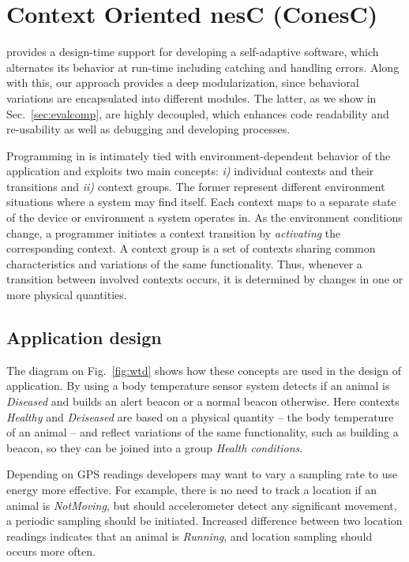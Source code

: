 
\section{Context Oriented nesC (ConesC)}\label{sec:conesc}

\conesc provides a design-time support for developing a self-adaptive software,
which alternates its behavior at run-time including catching and handling
errors. Along with this, our approach provides a deep modularization, since
behavioral variations are encapsulated into different modules. The latter, as we
show in Sec.~\ref{sec:evalcomp}, are highly decoupled, which enhances code
readability and re-usability as well as debugging and developing processes.

Programming in \conesc is intimately tied with environment-dependent behavior of
the application and exploits two main concepts: \emph{i)} individual contexts
and their transitions and \emph{ii)} context groups. The former represent
different environment situations where a system may find itself. Each context
maps to a separate state of the device or environment a system operates in. As
the environment conditions change, a programmer initiates a context transition
by \emph{activating} the corresponding context. A context group is a set of
contexts sharing common characteristics and variations of the same
functionality. Thus, whenever a transition between involved contexts occurs, it
is determined by changes in one or more physical quantities.

\subsection{Application design}\label{sec:appdesign}

The diagram on Fig.~\ref{fig:wtd} shows how these concepts are used in the
design of application. By using a body temperature sensor system detects if an
animal is \emph{Diseased} and builds an alert beacon or a normal beacon
otherwise. Here contexts \emph{Healthy} and \emph{Deiseased} are based on a
physical quantity -- the body temperature of an animal -- and reflect variations
of the same functionality, such as building a beacon, so they can be joined into
a group \emph{Health conditions}.

Depending on GPS readings developers may want to vary a sampling rate to use
energy more effective. For example, there is no need to track a location if an
animal is \emph{NotMoving}, but should accelerometer detect any significant
movement, a periodic sampling should be initiated. Increased difference between
two location readings indicates that an animal is \emph{Running}, and location
sampling should occurs more often.


